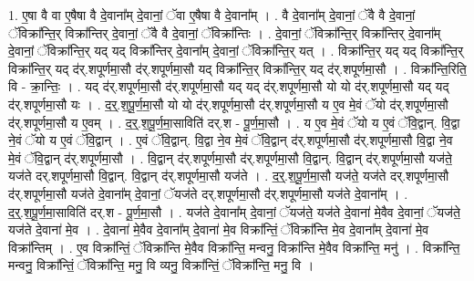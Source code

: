 \documentclass[17pt]{extarticle}
\begin{document}
1. ए॒षा वै वा ए॒षैषा वै दे॒वाना᳚म् दे॒वानां॒ ॅवा ए॒षैषा वै दे॒वाना᳚म् । . वै दे॒वाना᳚म् दे॒वानां॒ ॅवै वै दे॒वानां॒ ॅविक्रा᳚न्ति॒र् विक्रा᳚न्तिर् दे॒वानां॒ ॅवै वै दे॒वानां॒ ॅविक्रा᳚न्तिः । . दे॒वानां॒ ॅविक्रा᳚न्ति॒र् विक्रा᳚न्तिर् दे॒वाना᳚म् दे॒वानां॒ ॅविक्रा᳚न्ति॒र् यद् यद् विक्रा᳚न्तिर् दे॒वाना᳚म् दे॒वानां॒ ॅविक्रा᳚न्ति॒र् यत् । . विक्रा᳚न्ति॒र् यद् यद् विक्रा᳚न्ति॒र् विक्रा᳚न्ति॒र् यद् द॑र्.शपूर्णमा॒सौ द॑र्.शपूर्णमा॒सौ यद् विक्रा᳚न्ति॒र् विक्रा᳚न्ति॒र् यद् द॑र्.शपूर्णमा॒सौ । . विक्रा᳚न्ति॒रिति॒ वि - क्रा॒न्तिः॒ । . यद् द॑र्.शपूर्णमा॒सौ द॑र्.शपूर्णमा॒सौ यद् यद् द॑र्.शपूर्णमा॒सौ यो यो द॑र्.शपूर्णमा॒सौ यद् यद् द॑र्.शपूर्णमा॒सौ यः । . द॒र्॒.श॒पू॒र्ण॒मा॒सौ यो यो द॑र्.शपूर्णमा॒सौ द॑र्.शपूर्णमा॒सौ य ए॒व मे॒वं ॅयो द॑र्.शपूर्णमा॒सौ द॑र्.शपूर्णमा॒सौ य ए॒वम् । . द॒र्॒.श॒पू॒र्ण॒मा॒साविति॑ दर्.श - पू॒र्ण॒मा॒सौ । . य ए॒व मे॒वं ॅयो य ए॒वं ॅवि॒द्वान्. वि॒द्वा ने॒वं ॅयो य ए॒वं ॅवि॒द्वान् । . ए॒वं ॅवि॒द्वान्. वि॒द्वा ने॒व मे॒वं ॅवि॒द्वान् द॑र्.शपूर्णमा॒सौ द॑र्.शपूर्णमा॒सौ वि॒द्वा ने॒व मे॒वं ॅवि॒द्वान् द॑र्.शपूर्णमा॒सौ । . वि॒द्वान् द॑र्.शपूर्णमा॒सौ द॑र्.शपूर्णमा॒सौ वि॒द्वान्. वि॒द्वान् द॑र्.शपूर्णमा॒सौ यज॑ते॒ यज॑ते दर्.शपूर्णमा॒सौ वि॒द्वान्. वि॒द्वान् द॑र्.शपूर्णमा॒सौ यज॑ते । . द॒र्॒.श॒पू॒र्ण॒मा॒सौ यज॑ते॒ यज॑ते दर्.शपूर्णमा॒सौ द॑र्.शपूर्णमा॒सौ यज॑ते दे॒वाना᳚म् दे॒वानां॒ ॅयज॑ते दर्.शपूर्णमा॒सौ द॑र्.शपूर्णमा॒सौ यज॑ते दे॒वाना᳚म् । . द॒र्॒.श॒पू॒र्ण॒मा॒साविति॑ दर्.श - पू॒र्ण॒मा॒सौ । . यज॑ते दे॒वाना᳚म् दे॒वानां॒ ॅयज॑ते॒ यज॑ते दे॒वाना॑ मे॒वैव दे॒वानां॒ ॅयज॑ते॒ यज॑ते दे॒वाना॑ मे॒व । . दे॒वाना॑ मे॒वैव दे॒वाना᳚म् दे॒वाना॑ मे॒व विक्रा᳚न्तिं॒ ॅविक्रा᳚न्ति मे॒व दे॒वाना᳚म् दे॒वाना॑ मे॒व विक्रा᳚न्तिम् । . ए॒व विक्रा᳚न्तिं॒ ॅविक्रा᳚न्ति मे॒वैव विक्रा᳚न्ति॒ मन्वनु॒ विक्रा᳚न्ति मे॒वैव विक्रा᳚न्ति॒ मनु॑ । . विक्रा᳚न्ति॒ मन्वनु॒ विक्रा᳚न्तिं॒ ॅविक्रा᳚न्ति॒ मनु॒ वि व्यनु॒ विक्रा᳚न्तिं॒ ॅविक्रा᳚न्ति॒ मनु॒ वि । \newline
\end{document}
